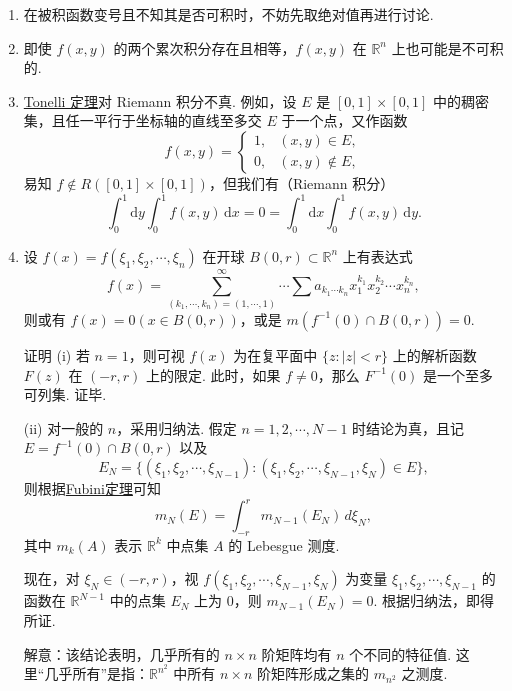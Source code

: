 \documentclass[../../main.tex]{subfiles}%
\begin{document}
\begin{remark}
\begin{enumerate}
\item 在被积函数变号且不知其是否可积时，不妨先取绝对值再进行讨论.

\item 即使 \( f(x, y) \) 的两个累次积分存在且相等，\( f(x, y) \) 在 \( \mathbb{R}^n \) 上也可能是不可积的.

\item \hyperref[theorem:Tonelli定理(非负可测函数的情形)]{Tonelli 定理}对 Riemann 积分不真. 例如，设 \( E \) 是 \( [0, 1] \times [0, 1] \) 中的稠密集，且任一平行于坐标轴的直线至多交 \( E \) 于一个点，又作函数
\[
f(x, y) = 
\begin{cases} 
1, & (x, y) \in E, \\
0, & (x, y) \notin E,
\end{cases}
\]
易知 \( f \notin R([0, 1] \times [0, 1]) \)，但我们有（Riemann 积分）
\[
\int_0^1 \mathrm{d}y \int_0^1 f(x, y) \, \mathrm{d}x = 0 = \int_0^1 \mathrm{d}x \int_0^1 f(x, y) \, \mathrm{d}y.
\]

\item 设 \( f(x) = f(\xi_1, \xi_2, \cdots, \xi_n) \) 在开球 \( B(0, r) \subset \mathbb{R}^n \) 上有表达式
\[
f(x) = \sum_{(k_1, \cdots, k_n) = (1, \cdots, 1)}^{\infty} \cdots \sum a_{k_1 \cdots k_n} x_1^{k_1} x_2^{k_2} \cdots x_n^{k_n},
\]
则或有 \( f(x) = 0 (x \in B(0, r)) \)，或是 \( m(f^{-1}(0) \cap B(0, r)) = 0 \).

证明 (i) 若 \( n = 1 \)，则可视 \( f(x) \) 为在复平面中 \( \{ z : |z| < r \} \) 上的解析函数 \( F(z) \) 在 \( (-r, r) \) 上的限定. 此时，如果 \( f \neq 0 \)，那么 \( F^{-1}(0) \) 是一个至多可列集. 证毕.

(ii) 对一般的 \( n \)，采用归纳法. 假定 \( n = 1, 2, \cdots, N - 1 \) 时结论为真，且记 \( E = f^{-1}(0) \cap B(0, r) \) 以及
\[
E_N = \{ (\xi_1, \xi_2, \cdots, \xi_{N - 1}) : (\xi_1, \xi_2, \cdots, \xi_{N - 1}, \xi_N) \in E \},
\]
则根据\hyperref[theorem:实变函数-Fubini定理]{Fubini定理}可知
\[
m_N(E) = \int_{-r}^r m_{N - 1}(E_N) \, d\xi_N,
\]
其中 \( m_k(A) \) 表示 \( \mathbb{R}^k \) 中点集 \( A \) 的 Lebesgue 测度.

现在，对 \( \xi_N \in (-r, r) \)，视 \( f(\xi_1, \xi_2, \cdots, \xi_{N - 1}, \xi_N) \) 为变量 \( \xi_1, \xi_2, \cdots, \xi_{N - 1} \) 的函数在 \( \mathbb{R}^{N - 1} \) 中的点集 \( E_N \) 上为 0，则 \( m_{N - 1}(E_N) = 0 \). 根据归纳法，即得所证.

解意：该结论表明，几乎所有的 \( n \times n \) 阶矩阵均有 \( n \) 个不同的特征值. 这里“几乎所有”是指：\( \mathbb{R}^{n^2} \) 中所有 \( n \times n \) 阶矩阵形成之集的 \( m_{n^2} \) 之测度.
\end{enumerate}
\end{remark}
\end{document}
